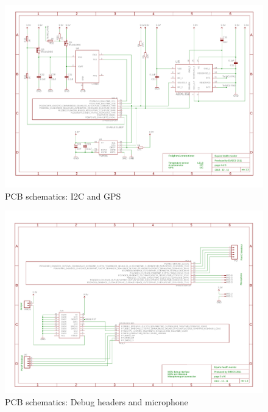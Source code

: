 \begin{figure}[htb]
\centering
\includegraphics[width=\columnwidth]{Images/pcb_i2c_gps}
\caption{PCB schematics: I2C and GPS}
\label{fig:pcb_schematics_3}
\end{figure}

\begin{figure}[htb]
\centering
\includegraphics[width=\columnwidth]{Images/pcb_debug_mic}
\caption{PCB schematics: Debug headers and microphone}
\label{fig:pcb_schematics_2}
\end{figure}




